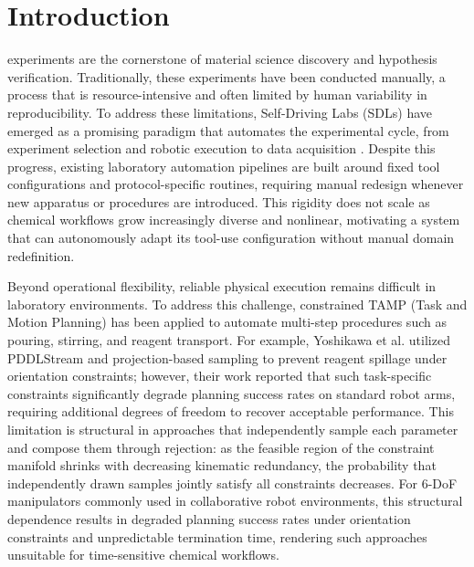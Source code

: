 \documentclass{ieeeaccess}
\begin{document}
\titlepgskip=-21pt

\maketitle

\section{Introduction}\label{sec:1}

 experiments are the cornerstone of material science discovery and hypothesis verification. Traditionally, these experiments have been conducted manually, a process that is resource-intensive and often limited by human variability in reproducibility. To address these limitations, Self-Driving Labs (SDLs) have emerged as a promising paradigm that automates the experimental cycle, from experiment selection and robotic execution to data acquisition \cite{bib3, bib4}. Despite this progress, existing laboratory automation pipelines are built around fixed tool configurations and protocol-specific routines, requiring manual redesign whenever new apparatus or procedures are introduced. This rigidity does not scale as chemical workflows grow increasingly diverse and nonlinear, motivating a system that can autonomously adapt its tool-use configuration without manual domain redefinition.

Beyond operational flexibility, reliable physical execution remains difficult in laboratory environments. To address this challenge, constrained TAMP (Task and Motion Planning) \cite{garrett2021integrated, wang2021learning} has been applied to automate multi-step procedures such as pouring, stirring, and reagent transport. For example, Yoshikawa et al. \cite{bib2} utilized PDDLStream \cite{bib5} and projection-based sampling \cite{kingston2019exploring} to prevent reagent spillage under orientation constraints; however, their work reported that such task-specific constraints significantly degrade planning success rates on standard robot arms, requiring additional degrees of freedom to recover acceptable performance. This limitation is structural in approaches that independently sample each parameter and compose them through rejection: as the feasible region of the constraint manifold shrinks with decreasing kinematic redundancy, the probability that independently drawn samples jointly satisfy all constraints decreases. For 6-DoF manipulators commonly used in collaborative robot environments, this structural dependence results in degraded planning success rates under orientation constraints and unpredictable termination time, rendering such approaches unsuitable for time-sensitive chemical workflows.
\end{document}

